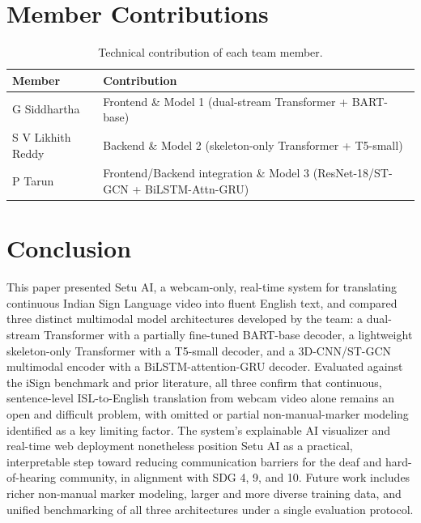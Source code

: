 \documentclass[pdflatex,sn-mathphys-num]{sn-jnl}
\begin{document}
\section{Member Contributions}\label{sec:contributions}
\begin{table}[h]
\centering
\caption{Technical contribution of each team member.}\label{tab:contributions}
\begin{tabular}{@{}ll@{}}
\toprule
Member & Contribution \\
\midrule
G Siddhartha & Frontend \& Model 1 (dual-stream Transformer + BART-base) \\
S V Likhith Reddy & Backend \& Model 2 (skeleton-only Transformer + T5-small) \\
P Tarun & Frontend/Backend integration \& Model 3 (ResNet-18/ST-GCN + BiLSTM-Attn-GRU) \\
\bottomrule
\end{tabular}
\end{table}

\section{Conclusion}\label{sec:conclusion}

This paper presented Setu AI, a webcam-only, real-time system for translating continuous Indian Sign Language video into fluent English text, and compared three distinct multimodal model architectures developed by the team: a dual-stream Transformer with a partially fine-tuned BART-base decoder, a lightweight skeleton-only Transformer with a T5-small decoder, and a 3D-CNN/ST-GCN multimodal encoder with a BiLSTM-attention-GRU decoder. Evaluated against the iSign benchmark and prior literature, all three confirm that continuous, sentence-level ISL-to-English translation from webcam video alone remains an open and difficult problem, with omitted or partial non-manual-marker modeling identified as a key limiting factor. The system's explainable AI visualizer and real-time web deployment nonetheless position Setu AI as a practical, interpretable step toward reducing communication barriers for the deaf and hard-of-hearing community, in alignment with SDG 4, 9, and 10. Future work includes richer non-manual marker modeling, larger and more diverse training data, and unified benchmarking of all three architectures under a single evaluation protocol.
\end{document}
